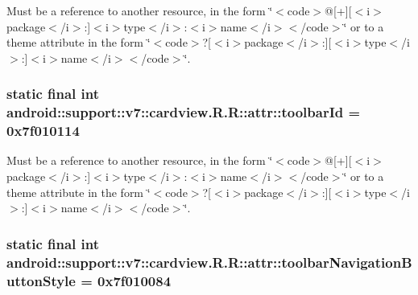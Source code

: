 Must be a reference to another resource, in the form \char`\"{}$<$code$>$@\mbox{[}+\mbox{]}\mbox{[}$<$i$>$package$<$/i$>$:\mbox{]}$<$i$>$type$<$/i$>$:$<$i$>$name$<$/i$>$$<$/code$>$\char`\"{} or to a theme attribute in the form \char`\"{}$<$code$>$?\mbox{[}$<$i$>$package$<$/i$>$:\mbox{]}\mbox{[}$<$i$>$type$<$/i$>$:\mbox{]}$<$i$>$name$<$/i$>$$<$/code$>$\char`\"{}. \hypertarget{classandroid_1_1support_1_1v7_1_1cardview_1_1_r_1_1attr_7a7daffe1fa304b3ebaf962480d843e6}{
\subsubsection[{toolbarId}]{\setlength{\rightskip}{0pt plus 5cm}static final int android::support::v7::cardview.R.R::attr::toolbarId = 0x7f010114}}
\label{classandroid_1_1support_1_1v7_1_1cardview_1_1_r_1_1attr_7a7daffe1fa304b3ebaf962480d843e6}


Must be a reference to another resource, in the form \char`\"{}$<$code$>$@\mbox{[}+\mbox{]}\mbox{[}$<$i$>$package$<$/i$>$:\mbox{]}$<$i$>$type$<$/i$>$:$<$i$>$name$<$/i$>$$<$/code$>$\char`\"{} or to a theme attribute in the form \char`\"{}$<$code$>$?\mbox{[}$<$i$>$package$<$/i$>$:\mbox{]}\mbox{[}$<$i$>$type$<$/i$>$:\mbox{]}$<$i$>$name$<$/i$>$$<$/code$>$\char`\"{}. \hypertarget{classandroid_1_1support_1_1v7_1_1cardview_1_1_r_1_1attr_41b2c0b38f3f509d12094b759808d024}{
\subsubsection[{toolbarNavigationButtonStyle}]{\setlength{\rightskip}{0pt plus 5cm}static final int android::support::v7::cardview.R.R::attr::toolbarNavigationButtonStyle = 0x7f010084}}
\label{classandroid_1_1support_1_1v7_1_1cardview_1_1_r_1_1attr_41b2c0b38f3f509d12094b759808d024}


